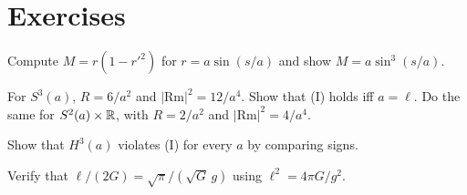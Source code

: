 \section*{Exercises}
\begin{exercise}
Compute $M=r(1-r'^2)$ for $r=a\sin(s/a)$ and show $M=a\sin^3(s/a)$.
\end{exercise}
\begin{exercise}
For $S^3(a)$, $R=6/a^2$ and $|\mathrm{Rm}|^2=12/a^4$. Show that (I) holds iff $a=\ell$. Do the same for $S^2(a)\times\mathbb{R}$, with $R=2/a^2$ and $|\mathrm{Rm}|^2=4/a^4$.
\end{exercise}
\begin{exercise}
Show that $H^3(a)$ violates (I) for every $a$ by comparing signs.
\end{exercise}
\begin{exercise}
Verify that $\ell/(2G)=\sqrt\pi/(\sqrt G\,g)$ using $\ell^2=4\pi G/g^2$.
\end{exercise}

